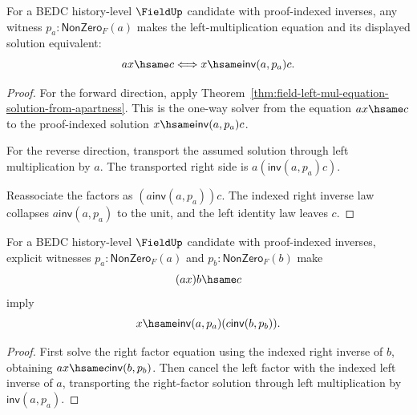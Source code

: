 \begin{theorem}
\label{thm:field-left-mul-equation-exact-from-apartness}
For a BEDC history-level $\FieldUp$ candidate with proof-indexed inverses,
any witness $p_a:\mathsf{NonZero}_F(a)$ makes the left-multiplication
equation and its displayed solution equivalent:
$$
a x\hsame c
\Longleftrightarrow
x\hsame \mathsf{inv}(a,p_a)c.
$$
\end{theorem}
\begin{proof}
For the forward direction, apply
Theorem~\ref{thm:field-left-mul-equation-solution-from-apartness}. This is
the one-way solver from the equation $a x\hsame c$ to the proof-indexed
solution $x\hsame \mathsf{inv}(a,p_a)c$.

For the reverse direction, transport the assumed solution through left
multiplication by $a$. The transported right side is
$a(\mathsf{inv}(a,p_a)c)$.

Reassociate the factors as $(a\mathsf{inv}(a,p_a))c$. The indexed right
inverse law collapses $a\mathsf{inv}(a,p_a)$ to the unit, and the left
identity law leaves $c$.
\end{proof}

\begin{theorem}
\label{thm:field-middle-mul-equation-solution-from-apartness}
For a BEDC history-level $\FieldUp$ candidate with proof-indexed inverses,
explicit witnesses $p_a:\mathsf{NonZero}_F(a)$ and
$p_b:\mathsf{NonZero}_F(b)$ make
$$
(a x)b\hsame c
$$
imply
$$
x\hsame \mathsf{inv}(a,p_a)(c\mathsf{inv}(b,p_b)).
$$
\end{theorem}
\begin{proof}
First solve the right factor equation using the indexed right inverse of $b$,
obtaining $a x\hsame c\mathsf{inv}(b,p_b)$. Then cancel the left factor
with the indexed left inverse of $a$, transporting the right-factor solution
through left multiplication by $\mathsf{inv}(a,p_a)$.
\end{proof}

